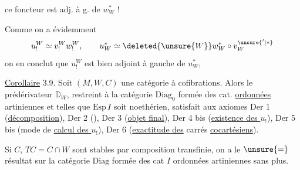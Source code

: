 ce foncteur est adj. à g. de $w_W^*$ !

Comme on a évidemment
\[
u_!^W\simeq v_!^W w_!^W,\qquad u_W^*\simeq \deleted{\unsure{W}}w_W^*\circ v_W^{\unsure{'|*}}
\]
on en conclut que $u_!^W$ est bien adjoint
à gauche de $u_W^*$, 

\uline{Corollaire} 3.9. Soit $(M,W,C)$ une catégorie
à cofibrations. Alors le prédérivateur
$\mathbb{D}_W$,  restreint à la catégorie 
$\mathrm{Diag}_0$ formée des cat.  \uline{ordonnées} 
artiniennes et telles que $\mathrm{Esp}\,I$
soit noethérien, satisfait aux
axiomes Der 1 (\uline{décomposition}), Der 2
(\uline{}), Der 3 (\uline{objet final}),
Der 4 bis (\uline{existence des $u_!$}), Der 5 bis
(mode de \uline{calcul des $u_!$}), Der 6
(\uline{exactitude des} carrés \uline{cocartésiens}).

Si $C$, $TC=C\cap W$ sont stables par composition
transfinie, on a le $\unsure{=}$ résultat
sur la catégorie $\mathrm{Diag}$ formée des
cat $I$ ordonnées artiniennes sans plus.
